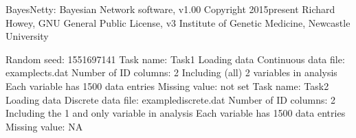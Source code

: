 \documentclass[letterpaper,10pt,english]{sphinxmanual}
\begin{document}
\begin{sphinxVerbatim}[commandchars=\\\{\}]
BayesNetty: Bayesian Network software, v1.00
\PYGZhy{}\PYGZhy{}\PYGZhy{}\PYGZhy{}\PYGZhy{}\PYGZhy{}\PYGZhy{}\PYGZhy{}\PYGZhy{}\PYGZhy{}\PYGZhy{}\PYGZhy{}\PYGZhy{}\PYGZhy{}\PYGZhy{}\PYGZhy{}\PYGZhy{}\PYGZhy{}\PYGZhy{}\PYGZhy{}\PYGZhy{}\PYGZhy{}\PYGZhy{}\PYGZhy{}\PYGZhy{}\PYGZhy{}\PYGZhy{}\PYGZhy{}\PYGZhy{}\PYGZhy{}\PYGZhy{}\PYGZhy{}\PYGZhy{}\PYGZhy{}\PYGZhy{}\PYGZhy{}\PYGZhy{}\PYGZhy{}\PYGZhy{}\PYGZhy{}\PYGZhy{}\PYGZhy{}\PYGZhy{}\PYGZhy{}\PYGZhy{}\PYGZhy{}\PYGZhy{}\PYGZhy{}\PYGZhy{}\PYGZhy{}
Copyright 2015\PYGZhy{}present Richard Howey, GNU General Public License, v3
Institute of Genetic Medicine, Newcastle University

Random seed: 1551697141
\PYGZhy{}\PYGZhy{}\PYGZhy{}\PYGZhy{}\PYGZhy{}\PYGZhy{}\PYGZhy{}\PYGZhy{}\PYGZhy{}\PYGZhy{}\PYGZhy{}\PYGZhy{}\PYGZhy{}\PYGZhy{}\PYGZhy{}\PYGZhy{}\PYGZhy{}\PYGZhy{}\PYGZhy{}\PYGZhy{}\PYGZhy{}\PYGZhy{}\PYGZhy{}\PYGZhy{}\PYGZhy{}\PYGZhy{}\PYGZhy{}\PYGZhy{}\PYGZhy{}\PYGZhy{}\PYGZhy{}\PYGZhy{}\PYGZhy{}\PYGZhy{}\PYGZhy{}\PYGZhy{}\PYGZhy{}\PYGZhy{}\PYGZhy{}\PYGZhy{}\PYGZhy{}\PYGZhy{}\PYGZhy{}\PYGZhy{}\PYGZhy{}\PYGZhy{}\PYGZhy{}\PYGZhy{}\PYGZhy{}\PYGZhy{}
Task name: Task\PYGZhy{}1
Loading data
Continuous data file: example\PYGZhy{}cts.dat
Number of ID columns: 2
Including (all) 2 variables in analysis
Each variable has 1500 data entries
Missing value: not set
\PYGZhy{}\PYGZhy{}\PYGZhy{}\PYGZhy{}\PYGZhy{}\PYGZhy{}\PYGZhy{}\PYGZhy{}\PYGZhy{}\PYGZhy{}\PYGZhy{}\PYGZhy{}\PYGZhy{}\PYGZhy{}\PYGZhy{}\PYGZhy{}\PYGZhy{}\PYGZhy{}\PYGZhy{}\PYGZhy{}\PYGZhy{}\PYGZhy{}\PYGZhy{}\PYGZhy{}\PYGZhy{}\PYGZhy{}\PYGZhy{}\PYGZhy{}\PYGZhy{}\PYGZhy{}\PYGZhy{}\PYGZhy{}\PYGZhy{}\PYGZhy{}\PYGZhy{}\PYGZhy{}\PYGZhy{}\PYGZhy{}\PYGZhy{}\PYGZhy{}\PYGZhy{}\PYGZhy{}\PYGZhy{}\PYGZhy{}\PYGZhy{}\PYGZhy{}\PYGZhy{}\PYGZhy{}\PYGZhy{}\PYGZhy{}
\PYGZhy{}\PYGZhy{}\PYGZhy{}\PYGZhy{}\PYGZhy{}\PYGZhy{}\PYGZhy{}\PYGZhy{}\PYGZhy{}\PYGZhy{}\PYGZhy{}\PYGZhy{}\PYGZhy{}\PYGZhy{}\PYGZhy{}\PYGZhy{}\PYGZhy{}\PYGZhy{}\PYGZhy{}\PYGZhy{}\PYGZhy{}\PYGZhy{}\PYGZhy{}\PYGZhy{}\PYGZhy{}\PYGZhy{}\PYGZhy{}\PYGZhy{}\PYGZhy{}\PYGZhy{}\PYGZhy{}\PYGZhy{}\PYGZhy{}\PYGZhy{}\PYGZhy{}\PYGZhy{}\PYGZhy{}\PYGZhy{}\PYGZhy{}\PYGZhy{}\PYGZhy{}\PYGZhy{}\PYGZhy{}\PYGZhy{}\PYGZhy{}\PYGZhy{}\PYGZhy{}\PYGZhy{}\PYGZhy{}\PYGZhy{}
Task name: Task\PYGZhy{}2
Loading data
Discrete data file: example\PYGZhy{}discrete.dat
Number of ID columns: 2
Including the 1 and only variable in analysis
Each variable has 1500 data entries
Missing value: NA
\PYGZhy{}\PYGZhy{}\PYGZhy{}\PYGZhy{}\PYGZhy{}\PYGZhy{}\PYGZhy{}\PYGZhy{}\PYGZhy{}\PYGZhy{}\PYGZhy{}\PYGZhy{}\PYGZhy{}\PYGZhy{}\PYGZhy{}\PYGZhy{}\PYGZhy{}\PYGZhy{}\PYGZhy{}\PYGZhy{}\PYGZhy{}\PYGZhy{}\PYGZhy{}\PYGZhy{}\PYGZhy{}\PYGZhy{}\PYGZhy{}\PYGZhy{}\PYGZhy{}\PYGZhy{}\PYGZhy{}\PYGZhy{}\PYGZhy{}\PYGZhy{}\PYGZhy{}\PYGZhy{}\PYGZhy{}\PYGZhy{}\PYGZhy{}\PYGZhy{}\PYGZhy{}\PYGZhy{}\PYGZhy{}\PYGZhy{}\PYGZhy{}\PYGZhy{}\PYGZhy{}\PYGZhy{}\PYGZhy{}\PYGZhy{}

\end{sphinxVerbatim}
\end{document}

